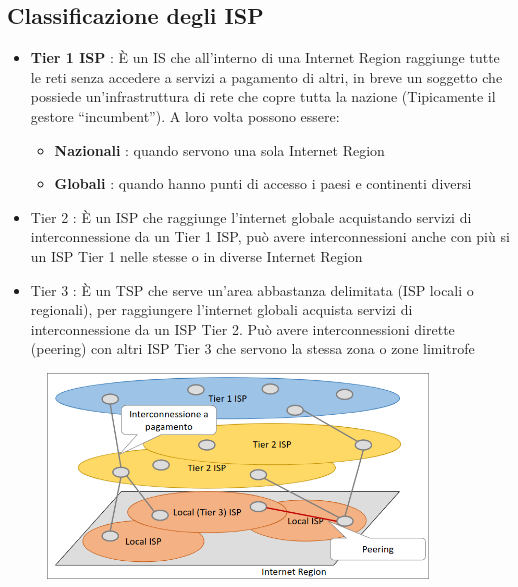 \documentclass{report}
\begin{document}
                \subsection{Classificazione degli ISP}
                    \begin{itemize}
                        \item \textbf{Tier 1 ISP }: È un IS che all'interno di una Internet Region raggiunge tutte le reti senza accedere a servizi a pagamento di altri, in breve un soggetto che possiede un'infrastruttura di rete che copre tutta la nazione (Tipicamente il gestore “incumbent”). A loro volta possono essere:
                        \begin{itemize}
                            \item \textbf{Nazionali} : quando servono una sola Internet Region
                            \item \textbf{Globali} : quando hanno punti di accesso i paesi e continenti diversi
                        \end{itemize}
                        \item Tier 2 : È un ISP che raggiunge l'internet globale acquistando servizi di interconnessione da un Tier 1 ISP, può avere interconnessioni anche con più si un ISP Tier 1 nelle stesse o in diverse Internet Region
                        \item Tier 3 : È un TSP che serve un'area abbastanza delimitata (ISP locali o regionali), per raggiungere l'internet globali acquista servizi di interconnessione da un ISP Tier 2. Può avere interconnessioni dirette (peering) con altri ISP Tier 3 che servono la stessa zona o zone limitrofe
                    \end{itemize}
                    \begin{figure}[H]
                        \includegraphics[width=0.9\textwidth]{3/class.png}
                    \end{figure}
\end{document}
